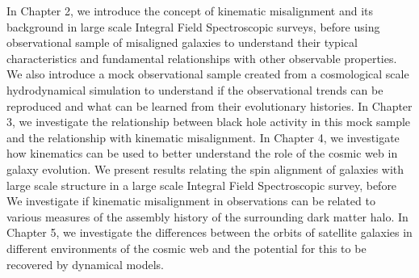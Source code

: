 In Chapter 2, we introduce the concept of kinematic misalignment and its background in large scale Integral Field Spectroscopic surveys, before using observational sample of misaligned galaxies to understand their typical characteristics and fundamental relationships with other observable properties. We also introduce a mock observational sample created from a cosmological scale hydrodynamical simulation to understand if the observational trends can be reproduced and what can be learned from their evolutionary histories. In Chapter 3, we investigate the relationship between black hole activity in this mock sample and the relationship with kinematic misalignment. In Chapter 4, we investigate how kinematics can be used to better understand the role of the cosmic web in galaxy evolution. We present results relating the spin alignment of galaxies with large scale structure in a large scale Integral Field Spectroscopic survey, before We investigate if kinematic misalignment in observations can be related to various measures of the assembly history of the surrounding dark matter halo. In Chapter 5, we investigate the differences between the orbits of satellite galaxies in different environments of the cosmic web and the potential for this to be recovered by dynamical models.